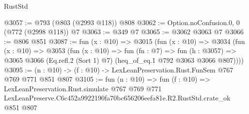\begin{lexlean}{RustStd}
\begin{coremodule}
@3057 := @793 (@803 (@2993 @118)) @808
@3062 := Option.noConfusion.{0, 0} (@772 (@2998 @118)) @7
@3063 := @349 @7
@3065 := @3062 @3063 @7
@3066 := @806 @851
@3087 := fun (x : @10) =>
  @3015
    (fun (x : @10) =>
    @3034
      (fun (x : @10) =>
      @3053
        (fun (x : @10) =>
        fun (fn : @7) =>
        fun (h : @3057) =>
        @3065 @3066 (Eq.refl.{2} (Sort 1) @7) (heq_of_eq.{1} @792 @3063 @3066 @807))))
@3095 := (n : @10) -> (f : @10) -> LexLeanPreservation.Rust.FunSem @767 @769 @771 @851 @807
@3105 := fun (n : @10) =>
  fun (f : @10) =>
  LexLeanPreservation.Rust.simulate
    @767
    @769
    @771
    LexLeanPreserve.C6c452a9922190fa70bc656206eefa81e.R2.RustStd.crate_ok
    @851
    @807
\end{coremodule}
\end{lexlean}
